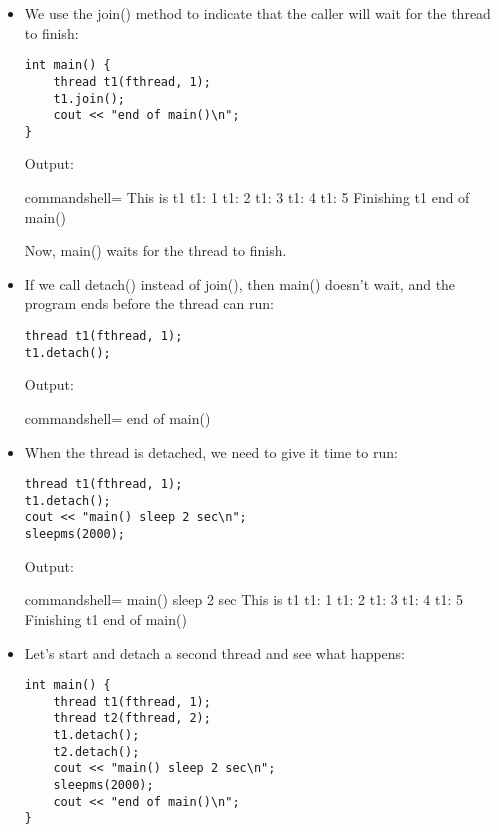 \begin{itemize}
\item 
We use the join() method to indicate that the caller will wait for the thread to finish:

\begin{lstlisting}[style=styleCXX]
int main() {
	thread t1(fthread, 1);
	t1.join();
	cout << "end of main()\n";
}
\end{lstlisting}

Output:

\begin{tcblisting}{commandshell={}}
This is t1
t1: 1
t1: 2
t1: 3
t1: 4
t1: 5
Finishing t1
end of main()
\end{tcblisting}

Now, main() waits for the thread to finish.

\item 
If we call detach() instead of join(), then main() doesn't wait, and the program ends before the thread can run:

\begin{lstlisting}[style=styleCXX]
thread t1(fthread, 1);
t1.detach();
\end{lstlisting}

Output:

\begin{tcblisting}{commandshell={}}
end of main()
\end{tcblisting}

\item 
When the thread is detached, we need to give it time to run:

\begin{lstlisting}[style=styleCXX]
thread t1(fthread, 1);
t1.detach();
cout << "main() sleep 2 sec\n";
sleepms(2000);
\end{lstlisting}

Output:

\begin{tcblisting}{commandshell={}}
main() sleep 2 sec
This is t1
t1: 1
t1: 2
t1: 3
t1: 4
t1: 5
Finishing t1
end of main()
\end{tcblisting}

\item 
Let's start and detach a second thread and see what happens:

\begin{lstlisting}[style=styleCXX]
int main() {
	thread t1(fthread, 1);
	thread t2(fthread, 2);
	t1.detach();
	t2.detach();
	cout << "main() sleep 2 sec\n";
	sleepms(2000);
	cout << "end of main()\n";
}
\end{lstlisting}


\end{itemize}
